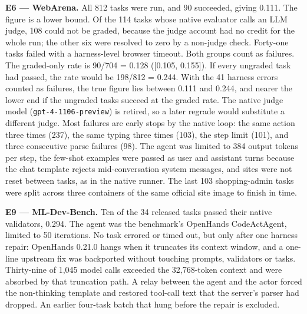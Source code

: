 \documentclass[12pt,a4paper]{report}
\begin{document}
\textbf{E6 --- WebArena.} All 812 tasks were run, and 90 succeeded,
giving 0.111. The figure is a lower bound. Of the 114 tasks whose native
evaluator calls an LLM judge, 108 could not be graded, because the judge
account had no credit for the whole run; the other six were resolved to
zero by a non-judge check. Forty-one tasks failed with a harness-level
browser timeout. Both groups count as failures. The graded-only rate is
90/704 = 0.128 ({[}0.105, 0.155{]}). If every ungraded task had passed,
the rate would be 198/812 = 0.244. With the 41 harness errors counted as
failures, the true figure lies between 0.111 and 0.244, and nearer the
lower end if the ungraded tasks succeed at the graded rate. The native
judge model (\texttt{gpt-4-1106-preview}) is retired, so a later regrade
would substitute a different judge. Most failures are early stops by the
native loop: the same action three times (237), the same typing three
times (103), the step limit (101), and three consecutive parse failures
(98). The agent was limited to 384 output tokens per step, the few-shot
examples were passed as user and assistant turns because the chat
template rejects mid-conversation system messages, and sites were not
reset between tasks, as in the native runner. The last 103
shopping-admin tasks were split across three containers of the same
official site image to finish in time.

\textbf{E9 --- ML-Dev-Bench.} Ten of the 34 released tasks passed their
native validators, 0.294. The agent was the benchmark's OpenHands
CodeActAgent, limited to 50 iterations. No task errored or timed out,
but only after one harness repair: OpenHands 0.21.0 hangs when it
truncates its context window, and a one-line upstream fix was backported
without touching prompts, validators or tasks. Thirty-nine of 1,045
model calls exceeded the 32,768-token context and were absorbed by that
truncation path. A relay between the agent and the actor forced the
non-thinking template and restored tool-call text that the server's
parser had dropped. An earlier four-task batch that hung before the
repair is excluded.
\end{document}
